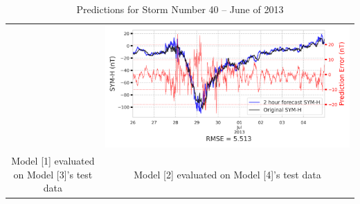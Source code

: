 \documentclass[draft,sw]{agutexSI2019}
\begin{document}
\begin{table}
\begin{tabular}{cc}
&
\includegraphics[width=0.49\linewidth]{paper_plots/2h_swics_model_on_no_swics/2h_swics_model_on_no_swics_storm_40.png}
\\
Model [1] evaluated on Model [3]'s test data & Model [2] evaluated on Model [4]'s test data
\vspace*{12pt}
\\
\end{tabular}
\caption{Predictions for Storm Number 40 -- June of 2013}
\label{storm-40}
\end{table}
\end{document}
